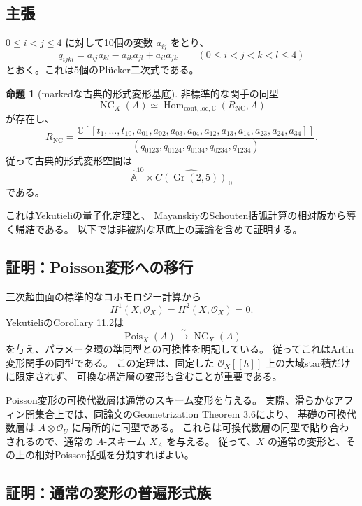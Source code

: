 \documentclass[a4paper,11pt]{ltjsarticle}
\theoremstyle{definition}
\newtheorem{theorem}{命題}[section]
\newcommand{\CC}{\mathbb C}
\newcommand{\OO}{\mathcal O}
\newcommand{\Aff}{\mathbb A}
\newcommand{\Gr}{\operatorname{Gr}}
\newcommand{\NC}{\operatorname{NC}}
\newcommand{\Pois}{\operatorname{Pois}}
\begin{document}
\subsection{主張}

$0\leq i<j\leq4$ に対して10個の変数 $a_{ij}$ をとり、
\[
 q_{ijkl}=a_{ij}a_{kl}-a_{ik}a_{jl}+a_{il}a_{jk}
 \qquad(0\leq i<j<k<l\leq4)
\]
とおく。これは5個のPlücker二次式である。

\begin{theorem}[markedな古典的形式変形基底]\label{thm:base}
非標準的な関手の同型
\[
 \NC_X(A)\simeq\operatorname{Hom}_{\mathrm{cont,loc},\CC}(R_{\NC},A)
\]
が存在し、
\begin{equation}\label{eq:base}
 R_{\NC}=
 \frac{\CC[[t_1,\ldots,t_{10},a_{01},a_{02},a_{03},a_{04},
                         a_{12},a_{13},a_{14},a_{23},a_{24},a_{34}]]}
 {(q_{0123},q_{0124},q_{0134},q_{0234},q_{1234})}.
\end{equation}
従って古典的形式変形空間は
\[
 \widehat{\Aff}^{10}\times
 \widehat{C(\Gr(2,5))}_{\,0}
\]
である。
\end{theorem}

これはYekutieliの量子化定理\cite[Corollary 11.2]{Yek}と、
MayanskiyのSchouten括弧計算\cite[Section 2.2]{May}の相対版から導く帰結である。
以下では非被約な基底上の議論を含めて証明する。

\subsection{証明：Poisson変形への移行}

三次超曲面の標準的なコホモロジー計算から
\[
 H^1(X,\OO_X)=H^2(X,\OO_X)=0.
\]
YekutieliのCorollary 11.2は
\[
 \Pois_X(A)\xrightarrow{\;\sim\;}\NC_X(A)
\]
を与え、パラメータ環の準同型との可換性を明記している。
従ってこれはArtin変形関手の同型である。
この定理は、固定した $\OO_X[[h]]$ 上の大域star積だけに限定されず、
可換な構造層の変形も含むことが重要である。

Poisson変形の可換代数層は通常のスキーム変形を与える。
実際、滑らかなアフィン開集合上では、同論文のGeometrization Theorem 3.6により、
基礎の可換代数層は $A\otimes\OO_U$ に局所的に同型である。
これらは可換代数層の同型で貼り合わされるので、通常の $A$-スキーム $X_A$ を与える。
従って、$X$ の通常の変形と、その上の相対Poisson括弧を分類すればよい。

\subsection{証明：通常の変形の普遍形式族}
\end{document}
